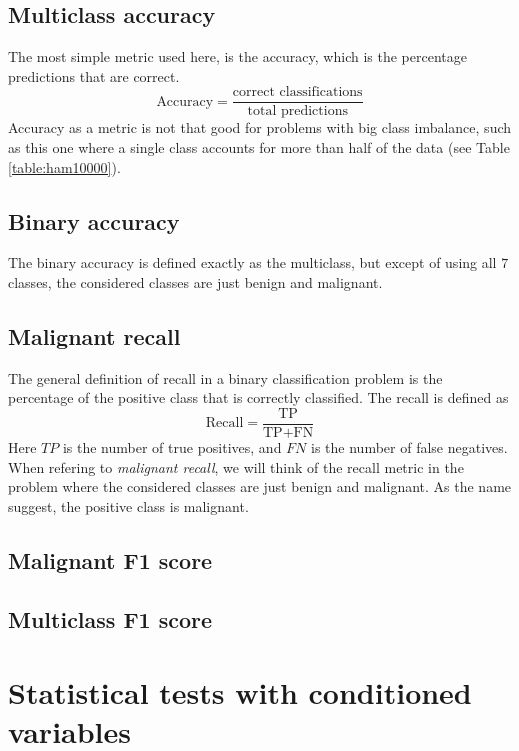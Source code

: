 \subsection{Multiclass accuracy}
The most simple metric used here, is the accuracy, which is the percentage predictions that are correct.
\[
    \text{Accuracy} = \frac{\text{correct classifications}}{\text{total predictions}}
\]
Accuracy as a metric is not that good for problems with big class imbalance,
such as this one where a single class accounts for more than half of the data (see Table \ref{table:ham10000}).

\subsection{Binary accuracy}
The binary accuracy is defined exactly as the multiclass, but except of using all $7$ classes,
the considered classes are just benign and malignant.

\subsection{Malignant recall}
The general definition of recall in a binary classification problem is the percentage of the positive class
that is correctly classified.
The recall is defined as
\[
    \text{Recall} = \frac{\text{TP}}{\text{TP} + \text{FN}}
\]
Here $TP$ is the number of true positives, and $FN$ is the number of false negatives.
When refering to \textit{malignant recall}, we will think of the recall metric in the problem
where the considered classes are just benign and malignant.
As the name suggest, the positive class is malignant.

\subsection{Malignant F1 score}

\subsection{Multiclass F1 score}





\section{Statistical tests with conditioned variables}\label{sec:statistical_tests_with_conditioned_variables}
